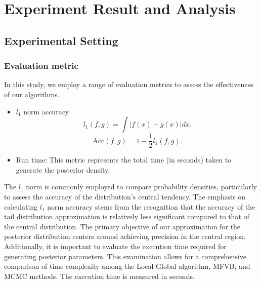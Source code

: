 \chapter{Experiment Result and Analysis}
\label{Chapter4}
\section{Experimental Setting}
\subsection{Evaluation metric}
In this study, we employ a range of evaluation metrics to assess the effectiveness of our algorithms.

\begin{itemize}
	\item $l_1$ norm accuracy 
	\begin{equation}
		l_1(f,g) = \int |f(x)-g(x)|dx.
	\end{equation}
	\begin{equation}
		\text{Acc}(f,g) = 1 - \frac{1}{2}l_1(f,g). 
	\end{equation}
	\item Run time: This metric represents the total time (in seconds) taken to generate the posterior density.
	
\end{itemize}
The $l_1$ norm is commonly employed to compare probability densities, particularly to assess the accuracy of the distribution's central tendency. The emphasis on calculating $l_1$ norm accuracy stems from the recognition that the accuracy of the tail distribution approximation is relatively less significant compared to that of the central distribution. The primary objective of our approximation for the posterior distribution centers around achieving precision in the central region.
Additionally, it is important to evaluate the execution time required for generating posterior parameters. This examination allows for a comprehensive comparison of time complexity among the Local-Global algorithm, MFVB, and MCMC methods. The execution time is measured in seconds.
%

